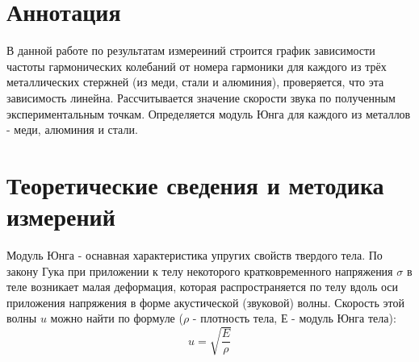 \section{Аннотация}

    В данной работе по результатам измереиний строится график зависимости частоты гармонических колебаний от номера гармоники для каждого из трёх металлических стержней (из меди, стали и алюминия), проверяется, что эта зависимость линейна. Рассчитывается значение скорости звука по полученным экспериментальным точкам. Определяется модуль Юнга для каждого из металлов - меди, алюминия и стали.


\section{Теоретические сведения и методика измерений}

    Модуль Юнга - оснавная характеристика упругих свойств твердого тела. По закону Гука при приложении к телу некоторого кратковременного напряжения $\sigma$ в теле возникает малая деформация, которая распространяется по телу вдоль оси приложения напряжения в форме акустической (звуковой) волны. Скорость этой волны $u$ можно найти по формуле ($\rho$ - плотность тела, Е - модуль Юнга тела):
\begin{equation} \label{скорость звука}
    u = \sqrt{\frac{E}{\rho}}
\end{equation}


